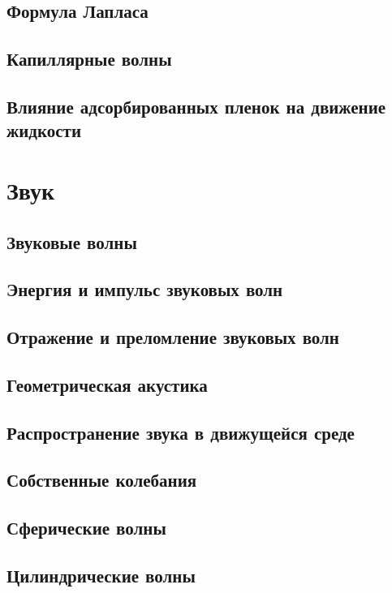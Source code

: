 \documentclass[12pt,a4paper]{book}
\begin{document}
\section{Формула Лапласа}\label{sec:p61}
\section{Капиллярные волны}\label{sec:p62}
\section{Влияние адсорбированных пленок на движение жидкости}\label{sec:p63}

\chapter{Звук}
\section{Звуковые волны}\label{sec:p64}
\section{Энергия и импульс звуковых волн}\label{sec:p65}
\section{Отражение и преломление звуковых волн}\label{sec:p66}
\section{Геометрическая акустика}\label{sec:p67}
\section{Распространение звука в движущейся среде}\label{sec:p68}
\section{Собственные колебания}\label{sec:p69}
\section{Сферические волны}\label{sec:p70}
\section{Цилиндрические волны}\label{sec:p71}
\end{document}
